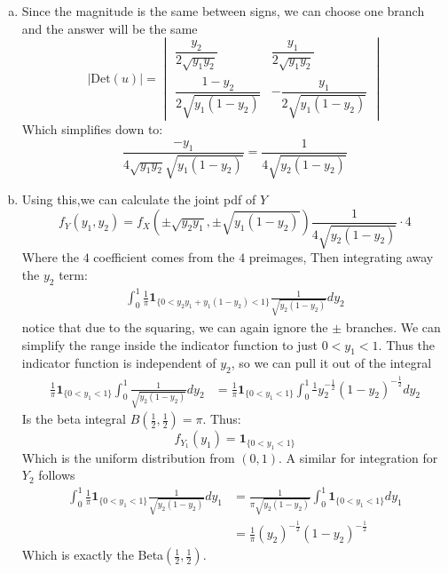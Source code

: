 \documentclass{article} %
\begin{document}
\begin{enumerate}[(a)]
    Since for any $(Y_1, Y_2)$, there are four possible $(X_1,
    X_2)$ vectors which might have produced it, $u$ is a $4$-to-$1$ function.
  \item Since the magnitude is the same between signs, we can choose
    one branch and the answer will be the same
    \[
      |\text{Det}(u)| =
      \begin{vmatrix}
        \dfrac{y_2}{2\sqrt{y_1y_2}} &
        \dfrac{y_1}{2\sqrt{y_1y_2}}
        \\[10pt]
        \dfrac{1-y_2}{2\sqrt{y_1(1-y_2)}} &
        -\dfrac{y_1}{2\sqrt{y_1(1-y_2)}}
      \end{vmatrix}
    \]
    Which simplifies down to:
    \[
      \frac{-y_1}{4\sqrt{y_1y_2}\sqrt{y_1(1-y_2)}} =
      \frac{1}{4\sqrt{y_2(1-y_2)}}
    \]
  \item
    Using this,we can calculate the joint pdf of $Y$
    \[
      f_Y(y_1, y_2) = f_X(\pm\sqrt{y_2y_1},
      \pm\sqrt{y_1(1-y_2)})\frac{1}{4\sqrt{y_2(1-y_2)}} \cdot 4
    \]
    Where the $4$ coefficient comes from the $4$ preimages, Then
    integrating away the $y_2$ term:
    \begin{align*}
      \int_0^1 \frac{1}{\pi} \mathbf{1}_{\{0 < y_2y_1 + y_1(1-y_2) <
      1\}}\frac{1}{\sqrt{y_2(1-y_2)}} dy_2
    \end{align*}
    notice that due to the squaring, we can again ignore the $\pm$
    branches. We can simplify the range inside the indicator function
    to just $0 < y_1 < 1$. Thus the indicator function is independent
    of $y_2$, so we can pull it out of the integral
    \begin{align*}
      \frac{1}{\pi} \mathbf{1}_{\{0 < y_1 <1\}}\int_0^1
      \frac{1}{\sqrt{y_2(1-y_2)}} dy_2 &=
      \frac{1}{\pi} \mathbf{1}_{\{0 < y_1 <1\}}\int_0^1
      \frac{1}{}y_2^{-\frac12}(1-y_2)^{-\frac12} dy_2
    \end{align*}
    Is the beta integral $B(\frac{1}2, \frac{1}2) = \pi$. Thus:
    \[
      f_{Y_1}(y_1) = \mathbf{1}_{\{0 < y_1 < 1\}}
    \]
    Which is the uniform distribution from $(0,1)$. A similar for
    integration for $Y_2$ follows
    \begin{align*}
      \int_0^1 \frac{1}{\pi} \mathbf{1}_{\{0 < y_1 <
      1\}}\frac{1}{\sqrt{y_2(1-y_2)}} dy_1 &=
      \frac{1}{\pi\sqrt{y_2(1-y_2)}}\int_0^1  \mathbf{1}_{\{0 < y_1 <
      1\}} dy_1
      \\
      &= \frac{1}{\pi}(y_2)^{-\frac{1}2}(1-y_2)^{-\frac{1}{2}}
    \end{align*}
    Which is exactly the Beta$(\frac{1}2, \frac{1}2)$.
\end{enumerate}
\end{document}
